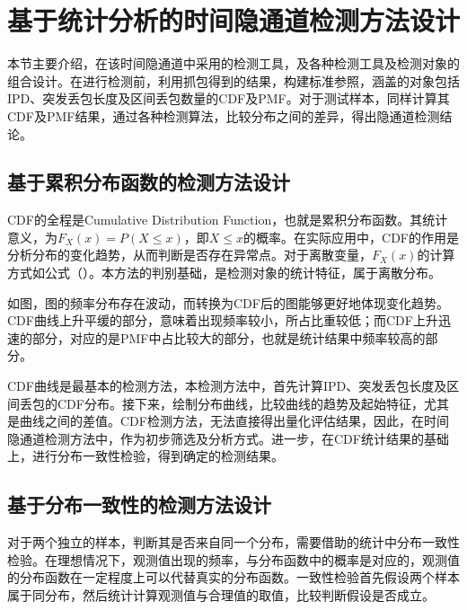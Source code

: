 \section{基于统计分析的时间隐通道检测方法设计}
\label{chap:analyze:statistical}

本节主要介绍，在该时间隐通道中采用的检测工具，及各种检测工具及检测对象的组合设计。在进行检测前，利用抓包得到的结果，构建标准参照，涵盖的对象包括IPD、突发丢包长度及区间丢包数量的CDF及PMF。对于测试样本，同样计算其CDF及PMF结果，通过各种检测算法，比较分布之间的差异，得出隐通道检测结论。

\subsection{基于累积分布函数的检测方法设计}
\label{chap:analyze:statistical:cdf}

CDF的全程是Cumulative Distribution Function，也就是累积分布函数。其统计意义，为$F_{X}(x)=P (X\leq x)$，即$X\leq x$的概率。在实际应用中，CDF的作用是分析分布的变化趋势，从而判断是否存在异常点。对于离散变量，$F_{X}(x)$的计算方式如公式（）。本方法的判别基础，是检测对象的统计特征，属于离散分布。


如图，图的频率分布存在波动，而转换为CDF后的图能够更好地体现变化趋势。CDF曲线上升平缓的部分，意味着出现频率较小，所占比重较低；而CDF上升迅速的部分，对应的是PMF中占比较大的部分，也就是统计结果中频率较高的部分。

CDF曲线是最基本的检测方法，本检测方法中，首先计算IPD、突发丢包长度及区间丢包的CDF分布。接下来，绘制分布曲线，比较曲线的趋势及起始特征，尤其是曲线之间的差值。CDF检测方法，无法直接得出量化评估结果，因此，在时间隐通道检测方法中，作为初步筛选及分析方式。进一步，在CDF统计结果的基础上，进行分布一致性检验，得到确定的检测结果。

\subsection{基于分布一致性的检测方法设计}
\label{chap:analyze:statistical:test}

对于两个独立的样本，判断其是否来自同一个分布，需要借助的统计中分布一致性检验。在理想情况下，观测值出现的频率，与分布函数中的概率是对应的，观测值的分布函数在一定程度上可以代替真实的分布函数。一致性检验首先假设两个样本属于同分布，然后统计计算观测值与合理值的取值，比较判断假设是否成立。

